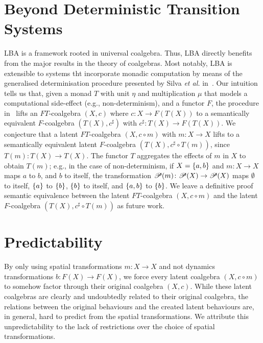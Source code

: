 \section{Beyond Deterministic Transition Systems}
LBA is a framework rooted in universal coalgebra. 
Thus, LBA directly benefits from the major results in the theory of coalgebras. Most notably, LBA is extensible to systems tht incorporate monadic computation by means of the generalised determinisation procedure presented by Silva \emph{et al.} in~\cite{GeneralisingDetermination}. 
Our intuition tells us that, given a monad $T$ with unit $\eta$ and multiplication $\mu$ that models a computational side-effect (e.g., non-determinism), and a functor $F$, the procedure in~\cite{GeneralisingDetermination} lifts an $FT$-coalgebra $(X,c)$ where $c\colon X\rightarrow F(T(X))$ to a semantically equivalent $F$-coalgebra $(T(X),c^\sharp)$ with $c^\sharp\colon T(X)\rightarrow F(T(X))$. We conjecture that a latent $FT$-coalgebra $(X,c\circ m)$ with $m\colon X\rightarrow X$ lifts to a semantically equivalent latent $F$-coalgebra $(T(X),c^\sharp\circ T(m))$, since $T(m)\colon T(X)\rightarrow T(X)$. 
The functor $T$ aggregates the effects of $m$ in $X$ to obtain $T(m)$; e.g., in the case of non-determinism, if $X=\left\{a,b\right\}$ and $m\colon X\rightarrow X$ maps $a$ to $b$, and $b$ to itself, the transformation ${{\mathscr{P}}\!\left({m}\right)}\colon {{\mathscr{P}}\!\left({X}\right)}\rightarrow {{\mathscr{P}}\!\left({X}\right)}$ maps $\emptyset$ to itself, $\left\{a\right\}$ to $\left\{b\right\}$, $\left\{b\right\}$ to itself, and $\left\{a,b\right\}$ to $\left\{b\right\}$. We leave a definitive proof semantic equivalence between the latent $FT$-coalgebra $(X,c\circ m)$ and the latent $F$-coalgebra $(T(X),c^\sharp\circ T(m))$ as future work. %


\section{Predictability} 
By only using spatial transformations $m\colon X\rightarrow X$ and not dynamics transformations $b\colon F(X)\rightarrow F(X)$, we force every latent coalgebra $(X,c\circ m)$ to somehow factor through their original coalgebra $(X,c)$. While these latent coalgebras are clearly and undoubtedly related to their original coalgebra, the relations between the original behaviours and the created latent behaviours are, in general, hard to predict from the spatial transformations. We attribute this unpredictability to the lack of restrictions over the choice of spatial transformations. 

